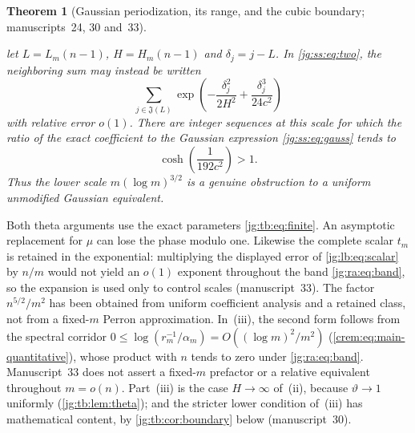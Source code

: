\documentclass[11pt,a4paper]{article}
\newtheorem{theorem}{Theorem}[section]
\theoremstyle{definition}\newaliascnt{definition}{theorem}
\theoremstyle{remark}\newaliascnt{remark}{theorem}
\begin{document}
\begin{theorem}[Gaussian periodization, its range, and the cubic boundary;
manuscripts~24, 30 and~33]
\begin{enumerate}
 let $L=L_m(n-1)$, $H=H_m(n-1)$ and $\delta_j=j-L$. In \eqref{jg:ss:eq:two},
 the neighboring sum may instead be written
 \begin{equation}\label{jg:ss:eq:cubicweights}
  \sum_{j\in\mathfrak J(L)}
  \exp\!\left(-\frac{\delta_j^2}{2H^2}+\frac{\delta_j^3}{24c^2}\right)
 \end{equation}
 with relative error $o(1)$. There are integer sequences at this scale for
 which the ratio of the exact coefficient to the Gaussian expression
 \eqref{jg:ss:eq:gauss} tends to
 \begin{equation}\label{jg:ss:eq:cosh}
  \cosh\!\left(\frac1{192c^2}\right)>1.
 \end{equation}
 Thus the lower scale $m(\log m)^{3/2}$ is a genuine obstruction to a uniform
 unmodified Gaussian equivalent.
\end{enumerate}
\end{theorem}

Both theta arguments use the exact parameters \eqref{jg:tb:eq:finite}. An
asymptotic replacement for $\mu$ can lose the phase modulo one. Likewise the
complete scalar $t_m$ is retained in the exponential: multiplying the displayed
error of \eqref{jg:lb:eq:scalar} by $n/m$ would not yield an $o(1)$ exponent
throughout the band \eqref{jg:ra:eq:band}, so the expansion is used only to
control scales (manuscript~33). The factor $n^{5/2}/m^2$ has been obtained from
uniform coefficient analysis and a retained class, not from a fixed-$m$ Perron
approximation. In~(iii), the second form follows from the spectral corridor
$0\le\log(r_m^{-1}/\alpha_m)=O((\log m)^2/m^2)$
(\eqref{crem:eq:main-quantitative}), whose product with $n$ tends to zero under
\eqref{jg:ra:eq:band}. Manuscript~33 does not assert a fixed-$m$ prefactor or a
relative equivalent throughout $m=o(n)$. Part~(iii) is the case $H\to\infty$
of~(ii), because $\vartheta\to1$ uniformly (\cref{jg:tb:lem:theta}); and the
stricter lower condition of~(iii) has mathematical content, by
\cref{jg:tb:cor:boundary} below (manuscript~30).
\end{document}
